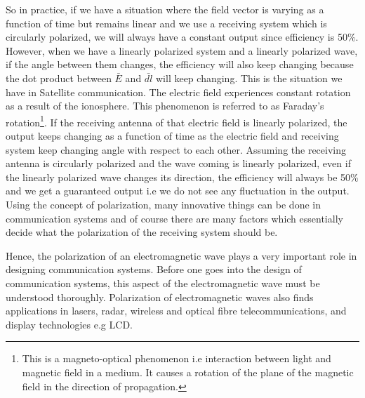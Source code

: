 So in practice, if we have a situation where the field vector is varying as a function of time but remains linear and we use a receiving system which is circularly polarized, we will always have a constant output since efficiency is 50\%. However, when we have a linearly polarized system and a linearly polarized wave, if the angle between them changes, the efficiency will also keep changing because the dot product between $ \bar {E} $ and $ \bar{dl} $ will keep changing. This is the situation we have in Satellite communication. The electric field experiences constant rotation as a result of the ionosphere. This phenomenon is referred to as Faraday's rotation\footnote{This is a magneto-optical phenomenon i.e interaction between light and magnetic field in a medium. It causes a rotation of the plane of the magnetic field in the direction of propagation.}. If the receiving antenna of that electric field is linearly polarized, the output keeps changing as a function of time as the electric field and receiving system keep changing angle with respect to each other. Assuming the receiving antenna is circularly polarized and the wave coming is linearly polarized, even if the linearly polarized wave changes its direction, the efficiency will always be 50\% and we get a guaranteed output i.e we do not see any fluctuation in the output. Using the concept of polarization, many innovative things can be done in communication systems and of course there are many factors which essentially decide what the polarization of the receiving system should be.

Hence, the polarization of an electromagnetic wave plays a very important role in designing communication systems. Before one goes into the design of communication systems, this aspect of the electromagnetic wave must be understood thoroughly. Polarization of electromagnetic waves also finds applications in lasers, radar, wireless and optical fibre telecommunications, and display technologies e.g LCD.


